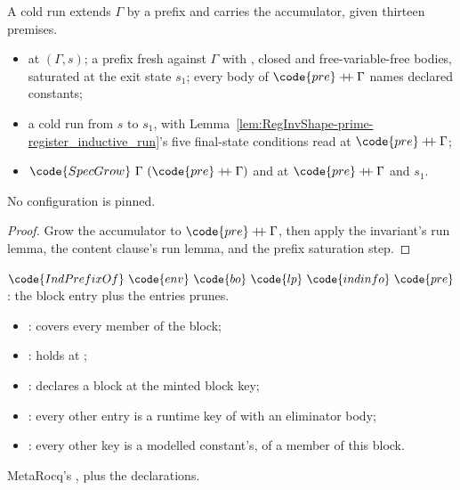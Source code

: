 \begin{lemma}
\label{lem:regInv_registerInd_step}
\leanok
{}
 A cold  run extends $\Gamma$ by a prefix and carries the
accumulator, given thirteen premises.
\begin{itemize}
\item {}  at $(\Gamma, s)$; a prefix  fresh against $\Gamma$ with
, closed and free-variable-free bodies, saturated at the exit state $s_1$; every body
of $\code{pre} \mathbin{+\!\!+} \Gamma$ names declared constants;
\item a cold run from $s$ to $s_1$, with Lemma~\ref{lem:RegInvShape-prime-register_inductive_run}'s five
final-state conditions read at $\code{pre} \mathbin{+\!\!+} \Gamma$;
\item {} $\code{SpecGrow}\ \Gamma\ (\code{pre} \mathbin{+\!\!+} \Gamma)$ and  at
$\code{pre} \mathbin{+\!\!+} \Gamma$ and $s_1$.
\end{itemize}
 No configuration is pinned.
\end{lemma}
\begin{proof}
\leanok
{}
 Grow the accumulator to $\code{pre} \mathbin{+\!\!+} \Gamma$, then apply the invariant's run
lemma, the content clause's run lemma, and the prefix saturation step.
\end{proof}
\begin{definition}
\label{def:IndPrefixOf}
\leanok
{}
 $\code{IndPrefixOf}\ \code{env}\ \code{bo}\ \code{lp}\ \code{indinfo}\ \code{pre}$: the
block entry plus the  entries \lbox{} prunes.
\begin{itemize}
\item {}:  covers every member of the block;
\item {}:  holds at ;
\item {}:  declares a block at the minted block key;
\item {}: every other entry is a runtime key of  with an eliminator body;
\item {}: every other key is a modelled  constant's, of a member of this block.
\end{itemize}
 MetaRocq's , plus the  declarations.
\end{definition}
